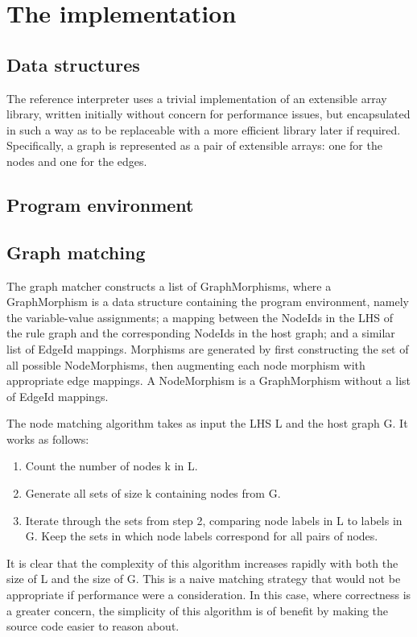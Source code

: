 
\section{The implementation}


\subsection{Data structures}

The reference interpreter uses a trivial implementation of an extensible array library, written initially without concern for performance issues, but encapsulated in such a way as to be replaceable with a more efficient library later if required. Specifically, a graph is represented as a pair of extensible arrays: one for the nodes and one for the edges.

\subsection{Program environment}

\subsection{Graph matching}

The graph matcher constructs a list of GraphMorphisms, where a GraphMorphism is a data structure containing the program environment, namely the variable-value assignments; a mapping between the NodeIds in the LHS of the rule graph and the corresponding NodeIds in the host graph; and a similar list of EdgeId mappings. Morphisms are generated by first constructing the set of all possible NodeMorphisms, then augmenting each node morphism with appropriate edge mappings. A NodeMorphism is a GraphMorphism without a list of EdgeId mappings.


The node matching algorithm takes as input the LHS L and the host graph G. It works as follows:

\begin{enumerate}
	\item Count the number of nodes k in L.
	\item Generate all sets of size k containing nodes from G.
	\item Iterate through the sets from step 2, comparing node labels in L to labels in G. Keep the sets in which node labels correspond for all pairs of nodes.
\end{enumerate}

It is clear that the complexity of this algorithm increases rapidly with both the size of L and the size of G. This is a naive matching strategy that would not be appropriate if performance were a consideration. In this case, where correctness is a greater concern, the simplicity of this algorithm is of benefit by making the source code easier to reason about.


